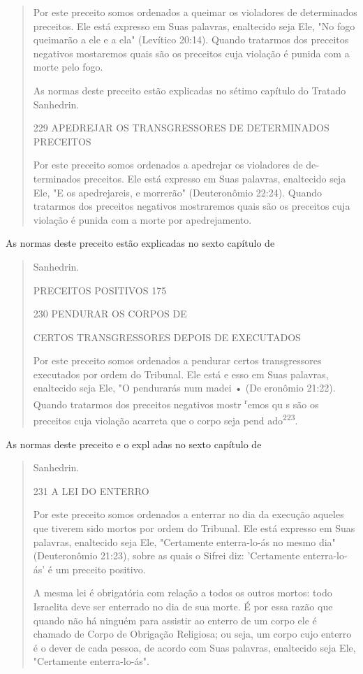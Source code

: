 \begin{quote}
Por este preceito somos ordenados a queimar os violadores de
de­terminados preceitos. Ele está expresso em Suas palavras, enaltecido
seja Ele, "No fogo queimarão a ele e a ela" (Levítico 20:14). Quando
tratarmos dos pre­ceitos negativos mostaremos quais são os preceitos
cuja violação é punida com a morte pelo fogo.

As normas deste preceito estão explicadas no sétimo capítulo do Tra­tado
Sanhedrin.

229 APEDREJAR OS TRANSGRESSORES DE DETERMINADOS PRECEITOS

Por este preceito somos ordenados a apedrejar os violadores de
de­terminados preceitos. Ele está expresso em Suas palavras, enaltecido
seja Ele, "E os apedrejareis, e morrerão" (Deuteronômio 22:24). Quando
tratarmos dos preceitos negativos mostraremos quais são os preceitos
cuja violação é punida com a morte por apedrejamento.
\end{quote}

As normas deste preceito estão explicadas no sexto capítulo de

\begin{quote}
Sanhedrin.

PRECEITOS POSITIVOS 175

230 PENDURAR OS CORPOS DE

CERTOS TRANSGRESSORES DEPOIS DE EXECUTADOS

Por este preceito somos ordenados a pendurar certos transgressores
executados por ordem do Tribunal. Ele está e esso em Suas palavras,
enalte­cido seja Ele, "O pendurarás num madei • (De eronômio 21:22).
Quando tratarmos dos preceitos negativos mostr \textsuperscript{r}emos
qu s são os preceitos cuja vio­lação acarreta que o corpo seja pend
ado\textsuperscript{223}.
\end{quote}

As normas deste preceito e o expl adas no sexto capítulo de

\begin{quote}
Sanhedrin.

231 A LEI DO ENTERRO

Por este preceito somos ordenados a enterrar no dia da execução aqueles
que tiverem sido mortos por ordem do Tribunal. Ele está expresso em Suas
palavras, enaltecido seja Ele, "Certamente enterra-lo-ás no mesmo dia"
(Deuteronômio 21:23), sobre as quais o Sifrei diz: 'Certamente
enterra-lo-ás' é um preceito positivo.

A mesma lei é obrigatória com relação a todos os outros mortos: to­do
Israelita deve ser enterrado no dia de sua morte. É por essa razão que
quan­do não há ninguém para assistir ao enterro de um corpo ele é
chamado de Corpo de Obrigação Religiosa; ou seja, um corpo cujo enterro
é o dever de cada pessoa, de acordo com Suas palavras, enaltecido seja
Ele, "Certamente enterra-lo-ás".
\end{quote}

